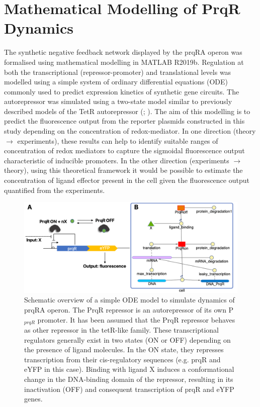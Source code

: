 \section{Mathematical Modelling of PrqR Dynamics}

The synthetic negative feedback network displayed by the prqRA operon was formalised using mathematical modelling in MATLAB R2019b. Regulation at both the transcriptional (repressor-promoter) and translational levels was modelled using a simple system of ordinary differential equations (ODE) commonly used to predict expression kinetics of synthetic gene circuits.
The autorepressor was simulated using a two-state model similar to previously described models of the TetR autorepressor (\citealt{Braun}; \citealt{Kelly2018}). The aim of this modelling is to predict the fluorescence output from the reporter plasmids constructed in this study depending on the concentration of redox-mediator. In one direction (theory $\rightarrow$ experiments), these results can help to identify suitable ranges of concentration of redox mediators to capture the sigmoidal fluorescence output characteristic of inducible promoters. In the other direction (experiments $\rightarrow$ theory), using this theoretical framework it would be possible to estimate the concentration of ligand effector present in the cell given the fluorescence output quantified from the experiments.




\begin{figure}[H]
    \centering
    \includegraphics[width=\hsize]{figs/modelling.png}
    \caption{Schematic overview of a simple ODE model to simulate dynamics of prqRA operon. The PrqR repressor is an autorepressor of its own P$_{prqR}$ promoter. It has been assumed that the PrqR repressor behaves as other repressor in the tetR-like family. These transcriptional regulators generally exist in two states (ON or OFF) depending on the presence of ligand molecules. In the ON state, they represses transcription from their cis-regulatory sequences (e.g. prqR and eYFP in this case). Binding with ligand X induces a conformational change in the DNA-binding domain of the repressor, resulting in its inactivation (OFF) and consequent transcription of prqR and eYFP genes.}
\end{figure}

